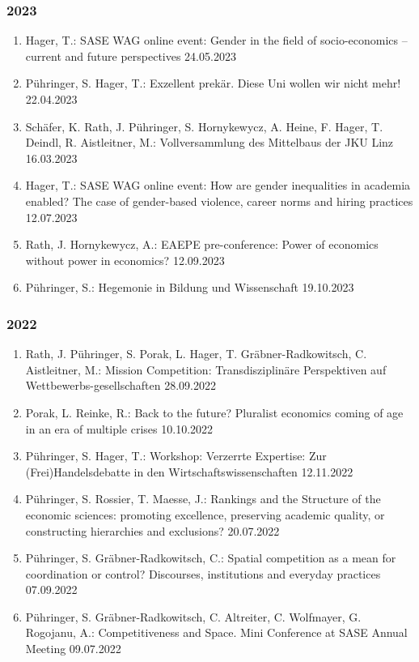 \subsubsection*{2023}
\begin{enumerate}
	\item Hager, T.: SASE WAG online event: Gender in the field of socio-economics – current and future perspectives 24.05.2023
	\item Pühringer, S. Hager, T.: Exzellent prekär. Diese Uni wollen wir nicht mehr! 22.04.2023
	\item Schäfer, K. Rath, J. Pühringer, S. Hornykewycz, A. Heine, F. Hager, T. Deindl, R. Aistleitner, M.: Vollversammlung des Mittelbaus der JKU Linz 16.03.2023
	\item Hager, T.: SASE WAG online event: How are gender inequalities in academia enabled? The case of gender-based violence, career norms and hiring practices 12.07.2023
	\item Rath, J. Hornykewycz, A.: EAEPE pre-conference: Power of economics without power in economics? 12.09.2023
	\item Pühringer, S.: Hegemonie in Bildung und Wissenschaft 19.10.2023
\end{enumerate}
\subsubsection*{2022}
\begin{enumerate}
	\item Rath, J. Pühringer, S. Porak, L. Hager, T. Gräbner-Radkowitsch, C. Aistleitner, M.: Mission Competition: Transdisziplinäre Perspektiven auf Wettbewerbs-gesellschaften 28.09.2022
	\item Porak, L. Reinke, R.: Back to the future? Pluralist economics coming of age in an era of multiple crises 10.10.2022
	\item Pühringer, S. Hager, T.: Workshop: Verzerrte Expertise: Zur (Frei)Handelsdebatte in den Wirtschaftswissenschaften 12.11.2022
	\item Pühringer, S. Rossier, T. Maesse, J.: Rankings and the Structure of the economic sciences: promoting excellence, preserving academic quality, or constructing hierarchies and exclusions? 20.07.2022
	\item Pühringer, S. Gräbner-Radkowitsch, C.: Spatial competition as a mean for coordination or control? Discourses, institutions and everyday practices 07.09.2022
	\item Pühringer, S. Gräbner-Radkowitsch, C. Altreiter, C. Wolfmayer, G. Rogojanu, A.: Competitiveness and Space. Mini Conference at SASE Annual Meeting 09.07.2022
\end{enumerate}
